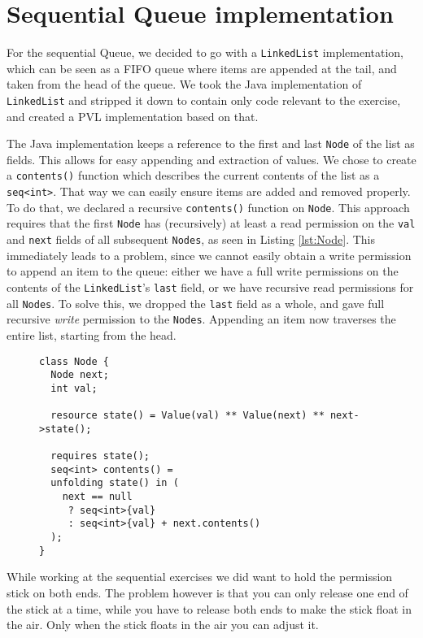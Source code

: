 \section{Sequential Queue implementation}

For the sequential Queue, we decided to go with a \texttt{LinkedList} implementation, which can be seen as a FIFO queue where items are appended at the tail, and taken from the head of the queue. We took the Java implementation of \texttt{LinkedList} and stripped it down to contain only code relevant to the exercise, and created a PVL implementation based on that.

The Java implementation keeps a reference to the first and last \texttt{Node} of the list as fields. This allows for easy appending and extraction of values.
We chose to create a \texttt{contents()} function which describes the current contents of the list as a \texttt{seq<int>}. That way we can easily ensure items are added and removed properly. To do that, we declared a recursive \texttt{contents()} function on \texttt{Node}. This approach requires that the first \texttt{Node} has (recursively) at least a read permission on the \texttt{val} and \texttt{next} fields of all subsequent \texttt{Nodes}, as seen in Listing \autoref{lst:Node}. This immediately leads to a problem, since we cannot easily obtain a write permission to append an item to the queue: either we have a full write permissions on the contents of the \texttt{LinkedList}'s \texttt{last} field, or we have recursive read permissions for all \texttt{Nodes}. To solve this, we dropped the \texttt{last} field as a whole, and gave full recursive \emph{write} permission to the \texttt{Nodes}. Appending an item now traverses the entire list, starting from the head.

\begin{figure}
\begin{lstlisting}[caption=Basic Node specification, captionpos=b]
class Node {
  Node next;
  int val;

  resource state() = Value(val) ** Value(next) ** next->state();

  requires state();
  seq<int> contents() =
  unfolding state() in (
    next == null
     ? seq<int>{val}
     : seq<int>{val} + next.contents()
  );
}
\end{lstlisting}
\label{lst:Node}
\end{figure}

While working at the sequential exercises we did want to hold the permission stick on both ends. The problem however is that you can only release one end of the stick at a time, while you have to release both ends to make the stick float in the air. Only when the stick floats in the air you can adjust it. 

